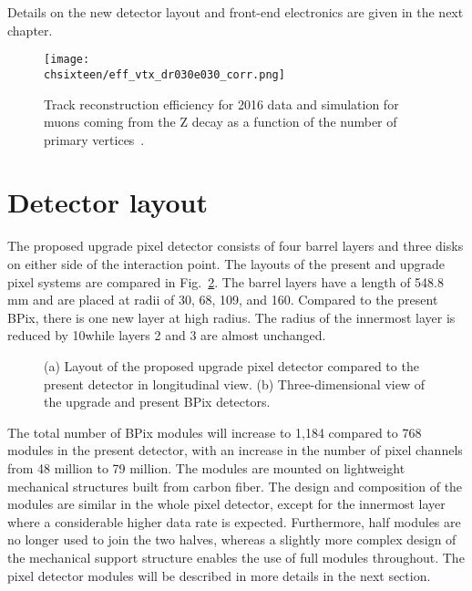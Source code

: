 Details on the new detector layout and front-end electronics are given in the next chapter.

\begin{figure}[!htb]
 \begin{center}
 \texttt{[image: \\chsixteen/eff\_vtx\_dr030e030\_corr.png]}
 \end{center}
 \caption{Track reconstruction efficiency for 2016 data and simulation for muons coming from the Z decay as a function of the number of primary vertices~\cite{TrkCMSPublicResults}.}
 \label{fig:trackEffPix}
\end{figure}

\section{Detector layout}

The proposed upgrade pixel detector consists of four barrel layers and three disks on either side of the interaction point.
The layouts of the present and upgrade pixel systems are compared in Fig.~\ref{fig:Phase1Layout}.
The barrel layers have a length of 548.8 mm and are placed at radii of 30, 68, 109, and 160\mm. Compared to the present BPix, there is one new layer at high radius.
The radius of the innermost layer is reduced by 10\mm while layers 2 and 3 are almost unchanged. 

\begin{figure}[!htb]
 \begin{center}
 \hspace{0.2cm}
 \end{center}
 \caption{(a) Layout of the proposed upgrade pixel detector compared to the present detector in longitudinal view. (b) Three-dimensional view of the upgrade and present BPix detectors.}
 \label{fig:Phase1Layout}
\end{figure}

The total number of BPix modules will increase to 1,184 compared to 768 modules in the present detector, with an increase in the number of pixel channels from 48 million to 79 million.
The modules are mounted on lightweight mechanical structures built from carbon fiber.
The design and composition of the modules are similar in the whole pixel detector, except for the innermost layer where a considerable higher data rate is expected.
Furthermore, half modules are no longer used to join the two halves, whereas a slightly more complex design of the mechanical support structure enables the use of full modules throughout.
The pixel detector modules will be described in more details in the next section.

